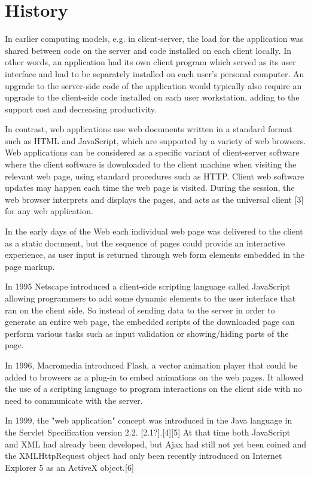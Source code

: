 \section{History}


In earlier computing models, e.g. in client-server, the load for the application was shared between code on the server and code installed on each client locally. In other words, an application had its own client program which served as its user interface and had to be separately installed on each user's personal computer. An upgrade to the server-side code of the application would typically also require an upgrade to the client-side code installed on each user workstation, adding to the support cost and decreasing productivity.

In contrast, web applications use web documents written in a standard format such as HTML and JavaScript, which are supported by a variety of web browsers. Web applications can be considered as a specific variant of client-server software where the client software is downloaded to the client machine when visiting the relevant web page, using standard procedures such as HTTP. Client web software updates may happen each time the web page is visited. During the session, the web browser interprets and displays the pages, and acts as the universal client [3] for any web application.

In the early days of the Web each individual web page was delivered to the client as a static document, but the sequence of pages could provide an interactive experience, as user input is returned through web form elements embedded in the page markup.

In 1995 Netscape introduced a client-side scripting language called JavaScript allowing programmers to add some dynamic elements to the user interface that ran on the client side. So instead of sending data to the server in order to generate an entire web page, the embedded scripts of the downloaded page can perform various tasks such as input validation or showing/hiding parts of the page.

In 1996, Macromedia introduced Flash, a vector animation player that could be added to browsers as a plug-in to embed animations on the web pages. It allowed the use of a scripting language to program interactions on the client side with no need to communicate with the server.

In 1999, the "web application" concept was introduced in the Java language in the Servlet Specification version 2.2. [2.1?].[4][5] At that time both JavaScript and XML had already been developed, but Ajax had still not yet been coined and the XMLHttpRequest object had only been recently introduced on Internet Explorer 5 as an ActiveX object.[6]

